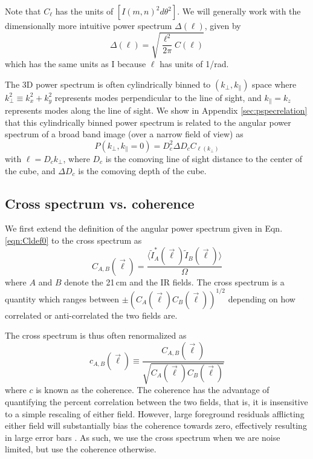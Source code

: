 \documentclass{emulateapj}
\begin{document}
Note that $C_\ell$ has the units of $[I(m,n)^2d\theta^2]$. We will generally work with the dimensionally more intuitive power spectrum $\Delta(\ell)$, given by
\begin{equation}
	\Delta(\ell)=\sqrt{\frac{\ell^2}{2\pi}C(\ell)}
\end{equation}
which has the same units as I because $\ell$ has units of 1/rad. 

The 3D power spectrum is often cylindrically binned to $(k_\perp,k_\parallel)$ space where $k_\perp^2\equiv k_x^2+k_y^2$ represents modes perpendicular to the line of sight, and $k_\parallel=k_z$ represents modes along the line of sight. We show in Appendix \ref{sec:pspecrelation}  that this cylindrically binned power spectrum is related to the angular power spectrum of a broad band image (over a narrow field of view) as
\begin{equation}
P(k_\perp,k_\parallel=0)=D_c^2 \Delta D_c C_{\ell(k_\perp)}	
\end{equation}
with $\ell=D_c k_\perp$, where $D_c$ is the comoving line of sight distance to the center of the cube, and $\Delta D_c$ is the comoving depth of the cube.

\subsection{Cross spectrum vs. coherence}

We first extend the definition of the angular power spectrum given in Eqn. \ref{eqn:Cldef0} to the cross spectrum as
\begin{equation}
\label{eqn:Cldefcross}
	C_{A,B}(\vec{\ell}) = \frac{\langle \tilde{I}_A^*(\vec{\ell})\tilde{I}_B(\vec{\ell})\rangle}{\Omega}
\end{equation}
where $A$ and $B$ denote the 21\,cm and the IR fields. The cross spectrum is a quantity which ranges between $\pm(C_{A}(\vec{\ell})C_{B}(\vec{\ell}))^{1/2}$ depending on how correlated or anti-correlated the two fields are. 

The cross spectrum is thus often renormalized as  
\begin{equation}
\label{eqn:Cldefcross}
	c_{A,B}(\vec{\ell}) \equiv \frac{C_{A,B}(\vec{\ell}) }{\sqrt{C_A(\vec{\ell})  C_B(\vec{\ell}) }}
\end{equation}
where $c$ is known as the coherence. The coherence has the advantage of quantifying the percent correlation between the two fields, that is, it is insensitive to a simple rescaling of either field. However, large foreground residuals afflicting either field will substantially bias the coherence towards zero, effectively resulting in large error bars \citep{lidz09,furlanettolidz07}. As such, we use the cross spectrum when we are noise limited, but use the coherence otherwise.
\end{document}
